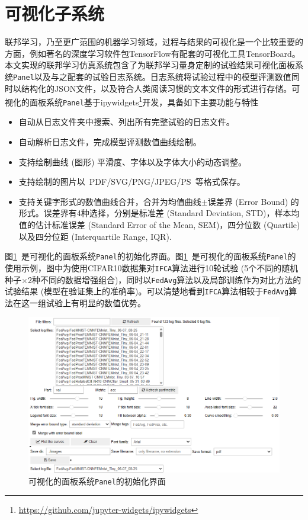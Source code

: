 \section{可视化子系统}
\label{sec:chap5-viz}


联邦学习，乃至更广范围的机器学习领域，过程与结果的可视化是一个比较重要的方面，例如著名的深度学习软件包TensorFlow\cite{tensorflow}有配套的可视化工具TensorBoard。本文实现的联邦学习仿真系统包含了为联邦学习量身定制的试验结果可视化面板系统\texttt{Panel}以及与之配套的试验日志系统。日志系统将试验过程中的模型评测数值同时以结构化的JSON文件，以及符合人类阅读习惯的文本文件的形式进行存储。可视化的面板系统\texttt{Panel}基于ipywidgets\footnote{\url{https://github.com/jupyter-widgets/ipywidgets}}开发，具备如下主要功能与特性
\begin{itemize}
    \item 自动从日志文件夹中搜索、列出所有完整试验的日志文件。
    \item 自动解析日志文件，完成模型评测数值曲线绘制。
    \item 支持绘制曲线 (图形) 平滑度、字体以及字体大小的动态调整。
    \item 支持绘制的图片以~PDF/SVG/PNG/JPEG/PS~等格式保存。
    \item 支持关键字形式的数值曲线合并，合并为均值曲线$\pm$误差界 (Error Bound) 的形式。误差界有4种选择，分别是标准差 (Standard Deviation, STD)，样本均值的估计标准误差 (Standard Error of the Mean, SEM)，四分位数 (Quartile)以及四分位距 (Interquartile Range, IQR).
\end{itemize}

图\ref{fig:panel-init}~是可视化的面板系统\texttt{Panel}的初始化界面。图\ref{fig:panel-init}~是可视化的面板系统\texttt{Panel}的使用示例，图中为使用CIFAR10数据集对\texttt{IFCA}算法\cite{Ghosh_2022_cfl}进行10轮试验 (5个不同的随机种子$\times$2种不同的数据增强组合)，同时以\texttt{FedAvg}算法以及局部训练作为对比方法的试验结果 (模型在验证集上的准确率)。可以清楚地看到\texttt{IFCA}算法相较于\texttt{FedAvg}算法在这一组试验上有明显的数值优势。

\begin{figure}[ht]
    \centering
    \includegraphics[width=\textwidth]{figures/panel-init.png}
    \caption{可视化的面板系统\texttt{Panel}的初始化界面}
    \label{fig:panel-init}
\end{figure}

